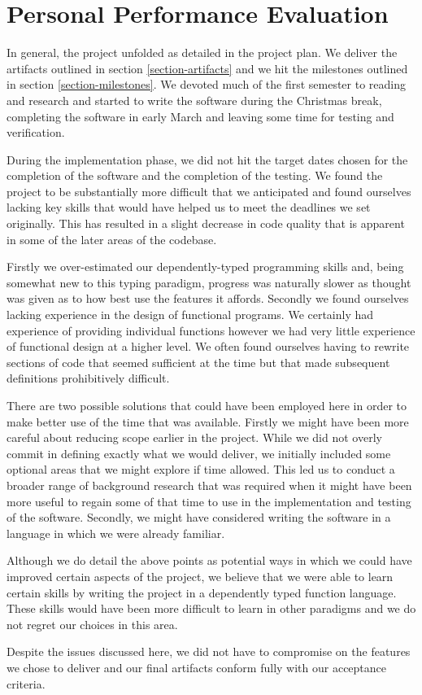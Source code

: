 \section{Personal Performance Evaluation}

In general, the project unfolded as detailed in the project plan. We
deliver the artifacts outlined in section \ref{section-artifacts} and we
hit the milestones outlined in section \ref{section-milestones}. We
devoted much of the first semester to reading and research and started
to write the software during the Christmas break, completing the
software in early March and leaving some time for testing and verification.

During the implementation phase, we did not hit the target
dates chosen for the completion of the software and the completion of
the testing. We found the project to be substantially more difficult
that we anticipated and found ourselves lacking key skills that would
have helped us to meet the deadlines we set originally. This has
resulted in a slight decrease in code quality that is apparent in some
of the later areas of the codebase.

Firstly we over-estimated our dependently-typed programming skills and,
being somewhat new to this typing paradigm, progress was naturally
slower as thought was given as to how best use the features it
affords. Secondly we found ourselves lacking experience in the design
of functional programs. We certainly had experience of providing
individual functions however we had very little experience of
functional design at a higher level. We often found ourselves having
to rewrite sections of code that seemed sufficient at the time but
that made subsequent definitions prohibitively difficult.

There are two possible solutions that could have been employed here in
order to make better use of the time that was available. Firstly we
might have been more careful about reducing scope earlier in the
project. While we did not overly commit in defining exactly what we
would deliver, we initially included some optional areas that we might
explore if time allowed. This led us to conduct a broader range of
background research that was required when it might have been
more useful to regain some of that time to use in the implementation
and testing of the software. Secondly, we might have considered
writing the software in a language in which we were already familiar.

Although we do detail the above points as potential ways in which we
could have improved certain aspects of the project, we believe that we
were able to learn certain skills by writing the project in a
dependently typed function language. These skills would have been more
difficult to learn in other paradigms and we do not regret our choices
in this area.

Despite the issues discussed here, we did not have to compromise on
the features we chose to deliver and our final artifacts conform fully
with our acceptance criteria.
